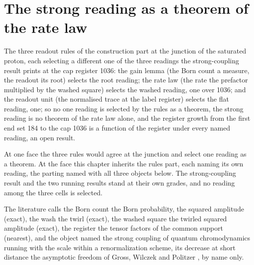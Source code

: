 \section{The strong reading as a theorem of the rate law}\label{mod:XIV-7-D536664-w-srda}
\begin{chwall}\label{box:XIV-7-D536664-w-srda:1}
The three readout rules of the construction part at the junction of the saturated proton, each selecting a different one of the three readings the strong-coupling result prints at the cap register 1036: the gain lemma (the Born count a measure, the readout its root) selects the root reading; the rate law (the rate the prefactor multiplied by the washed square) selects the washed reading, one over 1036; and the readout unit (the normalised trace at the label register) selects the flat reading, one; so no one reading is selected by the rules as a theorem, the strong reading is no theorem of the rate law alone, and the register growth from the first end set 184 to the cap 1036 is a function of the register under every named reading, an open result.
\end{chwall}
At one face the three rules would agree at the junction and select one reading as a theorem. At the face this chapter inherits the rules part, each naming its own reading, the parting named with all three objects below. The strong-coupling result and the two running results stand at their own grades, and no reading among the three cells is selected.
\begin{chbridge}
The literature calls the Born count the Born probability, the squared amplitude (exact), the wash the twirl (exact), the washed square the twirled squared amplitude (exact), the register the tensor factors of the common support (nearest), and the object named the strong coupling of quantum chromodynamics running with the scale within a renormalization scheme, its decrease at short distance the asymptotic freedom of Gross, Wilczek and Politzer \cite{Gross1973,Politzer1973}, by name only.
\end{chbridge}
